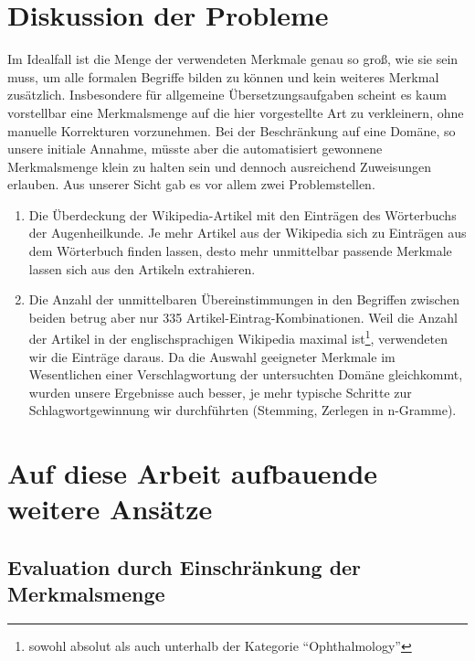 \documentclass[pagesize,paper=A4,DIV=calc,fontsize=12pt,draft=false]{scrreprt}
\begin{document}

\section{Diskussion der Probleme}

Im Idealfall ist die Menge der verwendeten Merkmale genau so groß, wie sie sein muss, um alle formalen Begriffe bilden zu können und kein weiteres Merkmal zusätzlich. 
Insbesondere für allgemeine Übersetzungsaufgaben scheint es kaum vorstellbar eine Merkmalsmenge auf die hier vorgestellte Art zu verkleinern, ohne manuelle Korrekturen vorzunehmen. 
Bei der Beschränkung auf eine Domäne, so unsere initiale Annahme, müsste aber die automatisiert gewonnene Merkmalsmenge klein zu halten sein und dennoch ausreichend Zuweisungen erlauben. 
Aus unserer Sicht gab es vor allem zwei Problemstellen. 
\begin{enumerate}
\item Die Überdeckung der Wikipedia-Artikel mit den Einträgen des Wörterbuchs der Augenheilkunde. 
Je mehr Artikel aus der Wikipedia sich zu Einträgen aus dem Wörterbuch finden lassen, desto mehr unmittelbar passende Merkmale lassen sich aus den Artikeln extrahieren. 
\item Die Anzahl der unmittelbaren Übereinstimmungen in den Begriffen zwischen beiden betrug aber nur 335 Artikel-Eintrag-Kombinationen. 
    Weil die Anzahl der Artikel in der englischsprachigen Wikipedia maximal ist\footnote{sowohl absolut als auch unterhalb der Kategorie \enquote{Ophthalmology}}, verwendeten wir die Einträge daraus. 
Da die Auswahl geeigneter Merkmale im Wesentlichen einer Verschlagwortung der untersuchten Domäne gleichkommt, wurden unsere Ergebnisse auch besser, je mehr typische Schritte zur Schlagwortgewinnung wir durchführten (Stemming, Zerlegen in n-Gramme). 
\end{enumerate}

\section{Auf diese Arbeit aufbauende weitere Ansätze}
\subsection{Evaluation durch Einschränkung der Merkmalsmenge}
\end{document}
